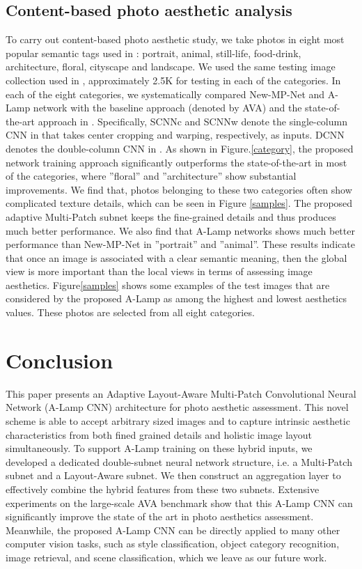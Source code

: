 \documentclass[10pt,twocolumn,letterpaper]{article}
\begin{document}
	
	
	\subsection{Content-based photo aesthetic analysis} \label{content}
	To carry out content-based photo aesthetic study, we take photos in eight most popular semantic tags used in \cite{Murray:MMP2012:AVA}: portrait, animal, still-life, food-drink, architecture, floral, cityscape and landscape. We used the same testing image collection used in \cite{Lu:2014:TMM:rating}, approximately 2.5K for testing in each of the categories. In each of the eight categories, we systematically compared New-MP-Net and A-Lamp network with the baseline approach \cite{Murray:MMP2012:AVA} (denoted by AVA) and the state-of-the-art approach in \cite{Lu:2014:TMM:rating}. Specifically, SCNN{\tiny c} and SCNN{\tiny w} denote the single-column CNN in \cite{Lu:2014:TMM:rating} that takes center cropping and warping, respectively, as inputs. DCNN denotes the double-column CNN in \cite{Lu:2014:TMM:rating}. As shown in Figure.\ref{category}, the proposed network training approach significantly outperforms the state-of-the-art in most of the categories, where ”floral” and ”architecture” show substantial improvements. We find that, photos belonging to these two categories often show complicated texture details, which can be seen in Figure \ref{samples}. The proposed adaptive Multi-Patch subnet keeps the fine-grained details and thus produces much better performance. We also find that A-Lamp networks shows much better performance than New-MP-Net in ”portrait” and ”animal”. These results indicate that once an image is associated with a clear semantic meaning, then the global view is more important than the local views in terms of assessing image aesthetics. Figure\ref{samples} shows some examples of the test images that are considered by the proposed A-Lamp as among the highest and lowest aesthetics values. These photos are selected from all eight categories.
	
	\section{Conclusion}
	This paper presents an Adaptive Layout-Aware Multi-Patch Convolutional Neural Network (A-Lamp CNN) architecture for photo aesthetic assessment. This novel scheme is able to accept arbitrary sized images and to capture intrinsic aesthetic characteristics from both fined grained details and holistic image layout simultaneously. To support A-Lamp training on these hybrid inputs, we  developed a dedicated double-subnet neural network structure, i.e. a Multi-Patch subnet and a Layout-Aware subnet. We then construct an aggregation layer to effectively combine the hybrid features from these two subnets. Extensive experiments on the large-scale AVA benchmark show that this A-Lamp CNN can significantly improve the state of the art in photo aesthetics assessment. Meanwhile, the proposed A-Lamp CNN can be directly applied to many other computer vision tasks, such as style classification, object category recognition, image retrieval, and scene classification, which we leave as our future work.
	
	\cleardoublepage
	{\small
		
		
	}
	
\end{document}
